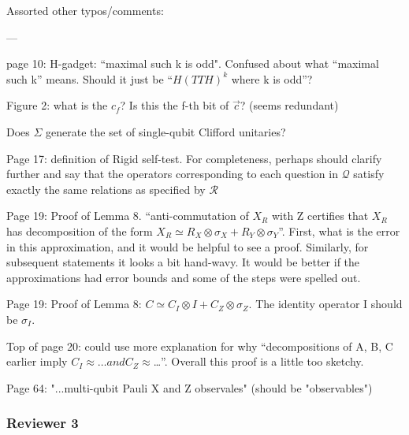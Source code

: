 \documentclass[12pt]{article}
\begin{document}
Assorted other typos/comments:

---


page 10: H-gadget: “maximal such k is odd". Confused about what “maximal such k” means. Should it just be “$H(TTH)^k$ where k is odd”?

Figure 2: what is the $c_f$? Is this the f-th bit of $\vec{c}$? (seems redundant)

Does $\Sigma$ generate the set of single-qubit Clifford unitaries?

Page 17: definition of Rigid self-test. For completeness, perhaps should clarify further and say that the operators corresponding to each question in $\mathcal{Q}$ satisfy exactly the same relations as specified by $\mathcal{R}$

Page 19: Proof of Lemma 8. “anti-commutation of $X_R$ with Z certifies that $X_R$ has decomposition of the form $X_R \simeq R_X \otimes \sigma_X + R_Y \otimes \sigma_Y$”. First, what is the error in this approximation, and it would be helpful to see a proof. Similarly, for subsequent statements it looks a bit hand-wavy. It would be better if the approximations had error bounds and some of the steps were spelled out. 

Page 19: Proof of Lemma 8: $C \simeq C_I \otimes I + C_Z \otimes \sigma_Z$. The identity operator I should be $\sigma_I$. 

Top of page 20: could use more explanation for why “decompositions of A, B, C earlier imply $C_I \approx… and C_Z \approx$…”. Overall this proof is a little too sketchy.

Page 64: "...multi-qubit Pauli X and Z observales" (should be "observables")

\subsubsection*{Reviewer 3}
\end{document}
